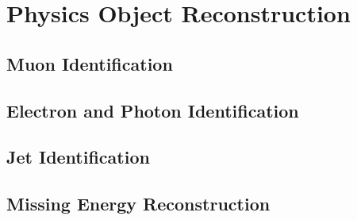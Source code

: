 \section{Physics Object Reconstruction}
\subsection{Muon Identification}
\subsection{Electron and Photon Identification}
\subsection{Jet Identification}
\subsection{Missing Energy Reconstruction}